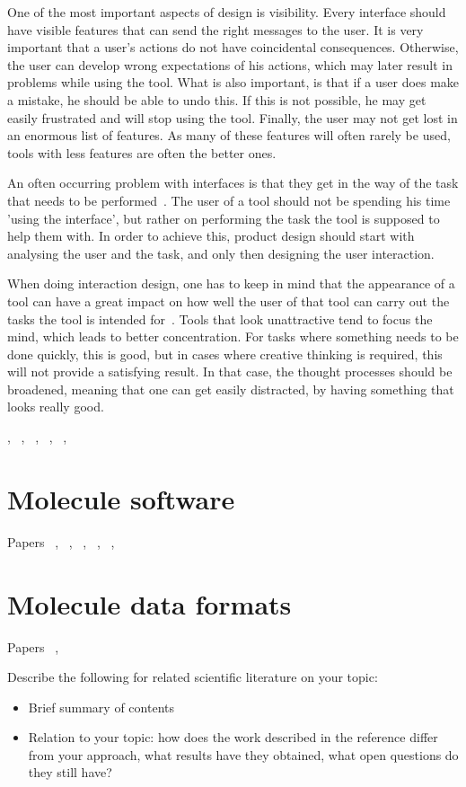 One of the most important aspects of design is visibility. Every interface should have visible features that can send the right messages to the user. It is very important that a user's actions do not have coincidental consequences. Otherwise, the user can develop wrong expectations of his actions, which may later result in problems while using the tool. What is also important, is that if a user does make a mistake, he should be able to undo this. If this is not possible, he may get easily frustrated and will stop using the tool. Finally, the user may not get lost in an enormous list of features. As many of these features will often rarely be used, tools with less features are often the better ones.

An often occurring problem with interfaces is that they get in the way of the task that needs to be performed~\cite{norman1990interfaces}. The user of a tool should not be spending his time 'using the interface', but rather on performing the task the tool is supposed to help them with. In order to achieve this, product design should start with analysing the user and the task, and only then designing the user interaction.

When doing interaction design, one has to keep in mind that the appearance of a tool can have a great impact on how well the user of that tool can carry out the tasks the tool is intended for~\cite{norman2002emotion}. Tools that look unattractive tend to focus the mind, which leads to better concentration. For tasks where something needs to be done quickly, this is good, but in cases where creative thinking is required, this will not provide a satisfying result. In that case, the thought processes should be broadened, meaning that one can get easily distracted, by having something that looks really good.


, ~\cite{norman2005human}, ~\cite{norman2010gestural}, ~\cite{thimbleby2007press}, ~\cite{blair2008user}, ~\cite{badre2002shaping}


\section{Molecule software}

Papers ~\cite{ertl2010molecular}, ~\cite{hanson2013jsmol}, ~\cite{bienfait2013jsme}, ~\cite{ekins2013tb}, ~\cite{fjeld2007tangible}, ~\cite{ertl2012molecule}


\section{Molecule data formats}

Papers ~\cite{daylight1992daylight}, ~\cite{heller2013inchi}





Describe the following for related scientific literature on your topic:
\begin{itemize}
\item Brief summary of contents
\item Relation to your topic: how does the work described in the reference differ from your approach, what results have they obtained, what open questions do they still have?
\end{itemize}
